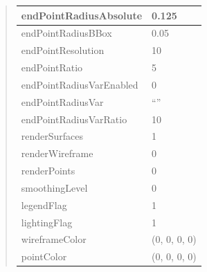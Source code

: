 \documentclass[letterpaper,10pt,english]{sphinxmanual}
\begin{document}
\begin{quote}
\begin{longtable}{|l|l|}
\hline
endPointRadiusAbsolute
 & 
0.125
\\
\hline
endPointRadiusBBox
 & 
0.05
\\
\hline
endPointResolution
 & 
10
\\
\hline
endPointRatio
 & 
5
\\
\hline
endPointRadiusVarEnabled
 & 
0
\\
\hline
endPointRadiusVar
 & 
``''
\\
\hline
endPointRadiusVarRatio
 & 
10
\\
\hline
renderSurfaces
 & 
1
\\
\hline
renderWireframe
 & 
0
\\
\hline
renderPoints
 & 
0
\\
\hline
smoothingLevel
 & 
0
\\
\hline
legendFlag
 & 
1
\\
\hline
lightingFlag
 & 
1
\\
\hline
wireframeColor
 & 
(0, 0, 0, 0)
\\
\hline
pointColor
 & 
(0, 0, 0, 0)
\\
\hline\end{longtable}

\end{quote}

\begin{DUlineblock}{0em}
\item[] 
\end{DUlineblock}

\begin{DUlineblock}{0em}
\item[] 
\end{DUlineblock}
\end{document}
